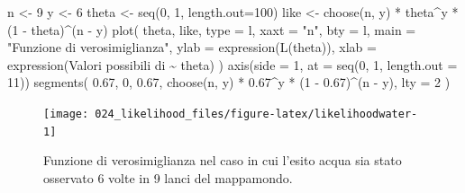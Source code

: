 \documentclass[
]{memoir}
\newenvironment{Shaded}{\begin{snugshade}}{\end{snugshade}}
\newcommand{\AttributeTok}[1]{\textcolor[rgb]{0.77,0.63,0.00}{#1}}
\newcommand{\DecValTok}[1]{\textcolor[rgb]{0.00,0.00,0.81}{#1}}
\newcommand{\FloatTok}[1]{\textcolor[rgb]{0.00,0.00,0.81}{#1}}
\newcommand{\FunctionTok}[1]{\textcolor[rgb]{0.00,0.00,0.00}{#1}}
\newcommand{\NormalTok}[1]{#1}
\newcommand{\OtherTok}[1]{\textcolor[rgb]{0.56,0.35,0.01}{#1}}
\newcommand{\SpecialCharTok}[1]{\textcolor[rgb]{0.00,0.00,0.00}{#1}}
\newcommand{\StringTok}[1]{\textcolor[rgb]{0.31,0.60,0.02}{#1}}
\theoremstyle{definition}
\theoremstyle{definition}
\theoremstyle{definition}
\theoremstyle{definition}
\theoremstyle{remark}
\begin{document}
\begin{Shaded}
\begin{Highlighting}[]
\NormalTok{n }\OtherTok{\textless{}{-}} \DecValTok{9}
\NormalTok{y }\OtherTok{\textless{}{-}} \DecValTok{6}
\NormalTok{theta }\OtherTok{\textless{}{-}} \FunctionTok{seq}\NormalTok{(}\DecValTok{0}\NormalTok{, }\DecValTok{1}\NormalTok{, }\AttributeTok{length.out=}\DecValTok{100}\NormalTok{)}
\NormalTok{like }\OtherTok{\textless{}{-}} \FunctionTok{choose}\NormalTok{(n, y) }\SpecialCharTok{*}\NormalTok{ theta}\SpecialCharTok{\^{}}\NormalTok{y }\SpecialCharTok{*}\NormalTok{ (}\DecValTok{1} \SpecialCharTok{{-}}\NormalTok{ theta)}\SpecialCharTok{\^{}}\NormalTok{(n }\SpecialCharTok{{-}}\NormalTok{ y)}
\FunctionTok{plot}\NormalTok{(}
\NormalTok{  theta, like, }
  \AttributeTok{type =} \StringTok{\textquotesingle{}l\textquotesingle{}}\NormalTok{, }
  \AttributeTok{xaxt =} \StringTok{"n"}\NormalTok{, }
  \AttributeTok{bty =} \StringTok{\textquotesingle{}l\textquotesingle{}}\NormalTok{,}
  \AttributeTok{main =} \StringTok{"Funzione di verosimiglianza"}\NormalTok{, }
  \AttributeTok{ylab =} \FunctionTok{expression}\NormalTok{(}\FunctionTok{L}\NormalTok{(theta)),}
  \AttributeTok{xlab =} \FunctionTok{expression}\NormalTok{(}\StringTok{\textquotesingle{}Valori possibili di\textquotesingle{}} \SpecialCharTok{\textasciitilde{}}\NormalTok{ theta)}
\NormalTok{)}
\FunctionTok{axis}\NormalTok{(}\AttributeTok{side =} \DecValTok{1}\NormalTok{, }\AttributeTok{at =} \FunctionTok{seq}\NormalTok{(}\DecValTok{0}\NormalTok{, }\DecValTok{1}\NormalTok{, }\AttributeTok{length.out =} \DecValTok{11}\NormalTok{))}
\FunctionTok{segments}\NormalTok{(}
  \FloatTok{0.67}\NormalTok{, }\DecValTok{0}\NormalTok{, }\FloatTok{0.67}\NormalTok{, }
  \FunctionTok{choose}\NormalTok{(n, y) }\SpecialCharTok{*} \FloatTok{0.67}\SpecialCharTok{\^{}}\NormalTok{y }\SpecialCharTok{*}\NormalTok{ (}\DecValTok{1} \SpecialCharTok{{-}} \FloatTok{0.67}\NormalTok{)}\SpecialCharTok{\^{}}\NormalTok{(n }\SpecialCharTok{{-}}\NormalTok{ y), }
  \AttributeTok{lty =} \DecValTok{2}
\NormalTok{)}
\end{Highlighting}
\end{Shaded}

\begin{figure}

{\centering \texttt{[image: 024\_likelihood\_files/figure-latex/likelihoodwater-1]} 

}

\caption{Funzione di verosimiglianza nel caso in cui l'esito acqua sia stato osservato 6 volte in 9 lanci del mappamondo.}\label{fig:likelihoodwater}
\end{figure}
\end{document}
